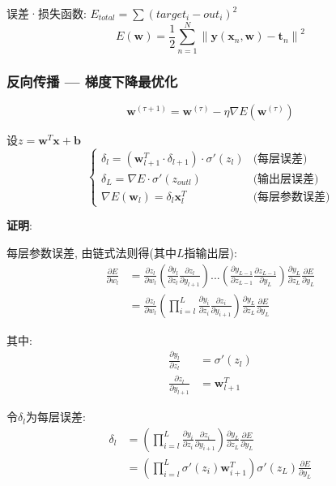 \documentclass{article}
\begin{document}
            误差·损失函数: $E_{total} = \sum (target_i - out_i)^2$
            $$E(\boldsymbol{w})=\frac{1}{2} \sum_{n=1}^{N}\left\|\boldsymbol{y}\left(\boldsymbol{x}_{n}, \boldsymbol{w}\right)-\boldsymbol{t}_{n}\right\|^{2}$$

        \subsubsection{反向传播 --- 梯度下降最优化}
    		$$\boldsymbol{w}^{(\tau+1)}=\boldsymbol{w}^{(\tau)}-\eta \nabla E\left(\boldsymbol{w}^{(\tau)}\right)$$
    		
    		设$z = \boldsymbol w^T \boldsymbol x + \boldsymbol b$
            $$\left \{ \begin{array}{lr}
                \delta_l = (\boldsymbol w_{l+1}^T·\delta_{l+1})·\sigma'(z_l) & \text{(每层误差)}\\
                \delta_L = \nabla E · \sigma'(z_{outl}) & \text{(输出层误差)}\\
                \nabla E(\boldsymbol w_l) = \delta_l \boldsymbol x_l^T & \text{(每层参数误差)}
            \end{array} \right.$$

            \textbf{证明}:
        		
        		每层参数误差, 由链式法则得(其中$L$指输出层): 
        		    \begin{align*}
        		        \frac{\partial E}{\partial w_l} 
        		        &= \frac{\partial z_l}{\partial w_l} \left(\frac{\partial y_l}{\partial z_l}\frac{\partial z_l}{\partial y_{l+1}}\right) ... \left(\frac{\partial y_{L-1}}{\partial z_{L-1}} \frac{\partial z_{L-1}}{\partial y_L} \right) \frac{\partial y_L}{\partial z_L} \frac{\partial E}{\partial y_L}\\
        		        &= \frac{\partial z_l}{\partial w_l}  \left(\prod_{i = l}^{L} \frac{\partial y_i}{\partial z_i}\frac{\partial z_i}{\partial y_{i+1}} \right) \frac{\partial y_L}{\partial z_L} \frac{\partial E}{\partial y_L}
        		    \end{align*}
        		    
        	    其中:
        		    \begin{align*}
        		        \frac{\partial y_l}{\partial z_l} &= \sigma'(z_l)\\
        		        \frac{\partial z_l}{\partial y_{l+1}} &= \boldsymbol w_{l+1}^T
        		    \end{align*}
        		    
        		令$\delta_l$为每层误差:
        		    \begin{align*}
        		        \delta_l &=\left(\prod_{i = l}^{L} \frac{\partial y_i}{\partial z_i}\frac{\partial z_i}{\partial y_{i+1}} \right) \frac{\partial y_L}{\partial z_L} \frac{\partial E}{\partial y_L}\\
        		        &= \left(\prod_{i = l}^{L} \sigma'(z_i)\boldsymbol w_{i+1}^T\right) \sigma '(z_L)\frac{\partial E}{\partial y_L}
        		    \end{align*}
        		    
\end{document}
